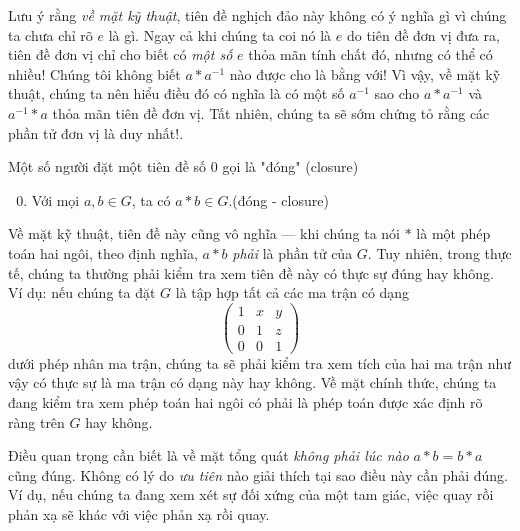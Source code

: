 Lưu ý rằng \emph{về mặt kỹ thuật}, tiên đề nghịch đảo này không có ý nghĩa gì vì chúng ta chưa chỉ rõ $e$ là gì. Ngay cả khi chúng ta coi nó là $e$ do tiên đề đơn vị đưa ra, tiên đề đơn vị chỉ cho biết có \emph{một số} $e$ thỏa mãn tính chất đó, nhưng có thể có nhiều! Chúng tôi không biết $a * a^{-1}$ nào được cho là bằng với! Vì vậy, về mặt kỹ thuật, chúng ta nên hiểu điều đó có nghĩa là có một số $a^{-1}$ sao cho $a*a^{-1}$ và $a^{-1} * a$ thỏa mãn tiên đề đơn vị. Tất nhiên, chúng ta sẽ sớm chứng tỏ rằng các phần tử đơn vị là duy nhất!.

Một số người đặt một tiên đề số 0 gọi là "đóng" (closure)
\begin{enumerate}[label=\arabic{*}.]
    \setcounter{enumi}{-1}
    \item Với mọi $a, b \in G$, ta có $a * b \in G$.\hfill (đóng - closure)
\end{enumerate}
Về mặt kỹ thuật, tiên đề này cũng vô nghĩa --- khi chúng ta nói $*$ là một phép toán hai ngôi, theo định nghĩa, $a * b$ \emph{phải} là phần tử của $G$. Tuy nhiên, trong thực tế, chúng ta thường phải kiểm tra xem tiên đề này có thực sự đúng hay không. Ví dụ: nếu chúng ta đặt $G$ là tập hợp tất cả các ma trận có dạng
\[
  \begin{pmatrix}
    1 & x & y\\
    0 & 1 & z\\
    0 & 0 & 1
  \end{pmatrix}
\]
dưới phép nhân ma trận, chúng ta sẽ phải kiểm tra xem tích của hai ma trận như vậy có thực sự là ma trận có dạng này hay không. Về mặt chính thức, chúng ta đang kiểm tra xem phép toán hai ngôi có phải là phép toán được xác định rõ ràng trên $G$ hay không.

Điều quan trọng cần biết là về mặt tổng quát \emph{không phải lúc nào} $a*b = b*a$ cũng đúng. Không có lý do \emph{ưu tiên} nào giải thích tại sao điều này cần phải đúng. Ví dụ, nếu chúng ta đang xem xét sự đối xứng của một tam giác, việc quay rồi phản xạ sẽ khác với việc phản xạ rồi quay.

